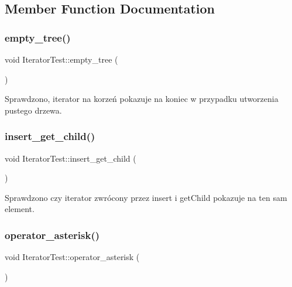 \subsection{Member Function Documentation}
\mbox{\label{class_iterator_test_a826f30ef86193414b8ceb03e76592b37}} 
\subsubsection{\texorpdfstring{empty\+\_\+tree()}{empty\_tree()}}
{\footnotesize\ttfamily void Iterator\+Test\+::empty\+\_\+tree (\begin{DoxyParamCaption}{ }\end{DoxyParamCaption})\hspace{0.3cm}{\ttfamily [inline]}}

Sprawdzono, iterator na korzeń pokazuje na koniec w przypadku utworzenia pustego drzewa. \mbox{\label{class_iterator_test_a12ba95e8b8465d2378afd5db43efc6e5}} 
\subsubsection{\texorpdfstring{insert\+\_\+get\+\_\+child()}{insert\_get\_child()}}
{\footnotesize\ttfamily void Iterator\+Test\+::insert\+\_\+get\+\_\+child (\begin{DoxyParamCaption}{ }\end{DoxyParamCaption})\hspace{0.3cm}{\ttfamily [inline]}}

Sprawdzono czy iterator zwrócony przez insert i get\+Child pokazuje na ten sam element. \mbox{\label{class_iterator_test_a7b80412e084b4a4502daddba5102e3c5}} 
\subsubsection{\texorpdfstring{operator\+\_\+asterisk()}{operator\_asterisk()}}
{\footnotesize\ttfamily void Iterator\+Test\+::operator\+\_\+asterisk (\begin{DoxyParamCaption}{ }\end{DoxyParamCaption})\hspace{0.3cm}{\ttfamily [inline]}}

